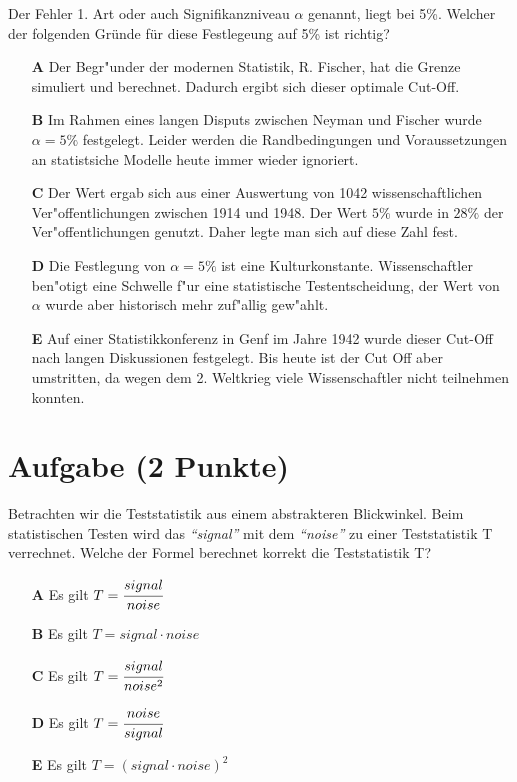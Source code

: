 \documentclass[a4paper, 9pt]{scrartcl}\usepackage[]{graphicx}\usepackage[]{xcolor}
\begin{document}
Der Fehler 1. Art oder auch Signifikanzniveau $\alpha$ genannt, liegt bei
5\%. Welcher der folgenden Gr{\"u}nde f{\"u}r diese Festlegeung auf 5\% ist richtig?



\begin{enumerate}
\item [\textbf{A} \msquare] Der Begr{"u}nder der modernen Statistik, R. Fischer, hat die Grenze simuliert und berechnet. Dadurch ergibt sich dieser optimale Cut-Off.
\item [\textbf{B} \msquare] Im Rahmen eines langen Disputs zwischen Neyman und Fischer wurde $\alpha = 5\%$ festgelegt. Leider werden die Randbedingungen und Voraussetzungen an statistsiche Modelle heute immer wieder ignoriert.
\item [\textbf{C} \msquare] Der Wert ergab sich aus einer Auswertung von 1042 wissenschaftlichen Ver{"o}ffentlichungen zwischen 1914 und 1948. Der Wert $5\%$ wurde in $28\%$ der Ver{"o}ffentlichungen genutzt. Daher legte man sich auf diese Zahl fest.
\item [\textbf{D} \msquare] Die Festlegung von $\alpha = 5\%$ ist eine Kulturkonstante. Wissenschaftler ben{"o}tigt eine Schwelle f{"u}r eine statistische Testentscheidung, der Wert von $\alpha$ wurde aber historisch mehr zuf{"a}llig gew{"a}hlt.
\item [\textbf{E} \msquare] Auf einer Statistikkonferenz in Genf im Jahre 1942 wurde dieser Cut-Off nach langen Diskussionen festgelegt. Bis heute ist der Cut Off aber umstritten, da wegen dem 2. Weltkrieg viele Wissenschaftler nicht teilnehmen konnten.
\end{enumerate}

\section{Aufgabe \hfill (2 Punkte)}

Betrachten wir die Teststatistik aus einem abstrakteren Blickwinkel. Beim
statistischen Testen wird das \textit{"`signal"'} mit dem
\textit{"`noise"'} zu einer Teststatistik T verrechnet. Welche der Formel
berechnet korrekt die Teststatistik T?



\begin{enumerate}
\item [\textbf{A} \msquare] Es gilt $T = \cfrac{signal}{noise}$
\item [\textbf{B} \msquare] Es gilt $T = signal \cdot noise$
\item [\textbf{C} \msquare] Es gilt $T = \cfrac{signal}{noise^2}$
\item [\textbf{D} \msquare] Es gilt $T = \cfrac{noise}{signal}$
\item [\textbf{E} \msquare] Es gilt $T = (signal \cdot noise)^2$
\end{enumerate}
\end{document}
